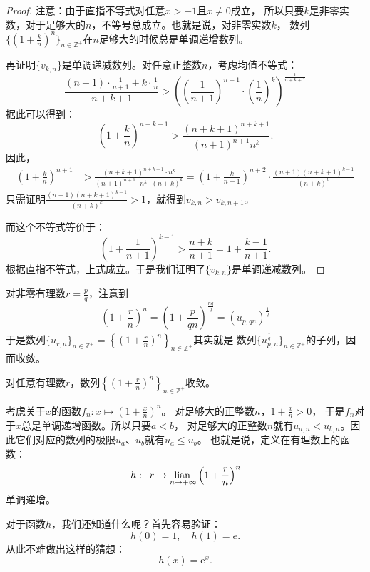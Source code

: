 \documentclass[12pt,UTF8,fontset=none]{ctexbook}
\begin{document}
\begin{appendix}
\begin{proof}
    注意：由于直指不等式对任意$x>-1$且$x\neq 0$成立，
    所以只要$k$是非零实数，对于足够大的$n$，不等号总成立。也就是说，对非零实数$k$，
    数列$\{\left(1 + \frac{k}{n}\right)^n\}_{n\in\mathbb{Z}^+}$在$n$足够大的时候总是单调递增数列。

    再证明$\{v_{k,n}\}$是单调递减数列。对任意正整数$n$，考虑均值不等式：
    $$ \frac{(n+1)\cdot \frac{1}{n+1} + k\cdot \frac{1}{n}}{n+k+1} > \left(\left(\frac{1}{n+1}\right)^{n+1} \cdot \left(\frac{1}{n}\right)^{k}\right)^{\frac{1}{n+k+1}} $$
    据此可以得到：
    $$ \left(1 + \frac{k}{n}\right)^{n+k+1} > \frac{(n+k+1)^{n+k+1}}{(n+1)^{n+1} n^k}. $$
    因此，
    \begin{align*}
        \left(1 + \frac{k}{n}\right)^{n+1} &> \frac{(n+k+1)^{n+k+1}\cdot n^k}{(n+1)^{n+1}\cdot n^k\cdot (n+k)^k} = \left(1 + \frac{k}{n+1}\right)^{n+2} \cdot \frac{(n+1)(n+k+1)^{k-1}}{(n+k)^k} 
    \end{align*}
    只需证明$\frac{(n+1)(n+k+1)^{k-1}}{(n+k)^k} > 1$，就得到$v_{k,n} > v_{k,n+1}$。
    
    而这个不等式等价于：
    $$ \left(1 + \frac{1}{n+1}\right)^{k-1} > \frac{n+k}{n+1} = 1 + \frac{k-1}{n+1}.$$
    根据直指不等式，上式成立。于是我们证明了$\{v_{k,n}\}$是单调递减数列。
\end{proof}

对非零有理数$r = \frac{p}{q}$，注意到
$$ \left(1 + \frac{r}{n}\right)^n = \left(1 + \frac{p}{qn}\right)^{\frac{nq}{q}} = \left(u_{p,qn}\right)^\frac{1}{q}$$
于是数列$\displaystyle\{u_{r,n}\}_{n\in\mathbb{Z}^+} = \left\{\left(1 + \frac{r}{n}\right)^n\right\}_{n\in\mathbb{Z}^+}$其实就是
数列$\{u_{p,n}^{\frac{1}{q}}\}_{n\in\mathbb{Z}^+}$的子列，因而收敛。

\begin{tm}\label{tm:b-1-40}
    对任意有理数$r$，数列$\left\{\left(1 + \frac{r}{n}\right)^n\right\}_{n\in\mathbb{Z}^+}$收敛。
\end{tm}

考虑关于$x$的函数$f_{n} : x \mapsto \left(1 + \frac{x}{n}\right)^n $。
对足够大的正整数$n$，$1 + \frac{x}{n} > 0$， 于是$f_n$对于$x$总是单调递增函数。所以只要$a < b$，
对足够大的正整数$n$就有$u_{a,n} < u_{b,n}$。因此它们对应的数列的极限$u_a$、$u_b$就有$u_a \leqslant u_b$。
也就是说，定义在有理数上的函数：
$$ h: \,\,\, r \mapsto \underset{n\to +\infty}{\operatorname{lian}\,}  \left(1 + \frac{r}{n}\right)^n $$
单调递增。

对于函数$h$，我们还知道什么呢？首先容易验证：
$$ h(0) = 1, \quad h(1) = e.$$ 
从此不难做出这样的猜想：
$$ h(x) = \mathrm{e}^x. $$


\end{appendix}
\end{document}
